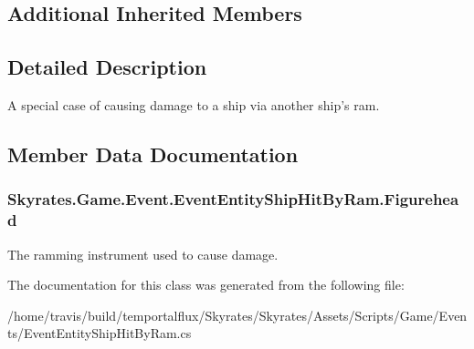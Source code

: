 \subsection*{Additional Inherited Members}


\subsection{Detailed Description}
A special case of causing damage to a ship via another ship's ram. 



\subsection{Member Data Documentation}
\hypertarget{class_skyrates_1_1_game_1_1_event_1_1_event_entity_ship_hit_by_ram_a6df0869cd6c096d332f5e93f2c521f2a}{
\subsubsection[{Figurehead}]{ Skyrates.\-Game.\-Event.\-Event\-Entity\-Ship\-Hit\-By\-Ram.\-Figurehead}}\label{class_skyrates_1_1_game_1_1_event_1_1_event_entity_ship_hit_by_ram_a6df0869cd6c096d332f5e93f2c521f2a}


The ramming instrument used to cause damage. 



The documentation for this class was generated from the following file\-:\begin{DoxyCompactItemize}
\item 
/home/travis/build/temportalflux/\-Skyrates/\-Skyrates/\-Assets/\-Scripts/\-Game/\-Events/Event\-Entity\-Ship\-Hit\-By\-Ram.\-cs\end{DoxyCompactItemize}
